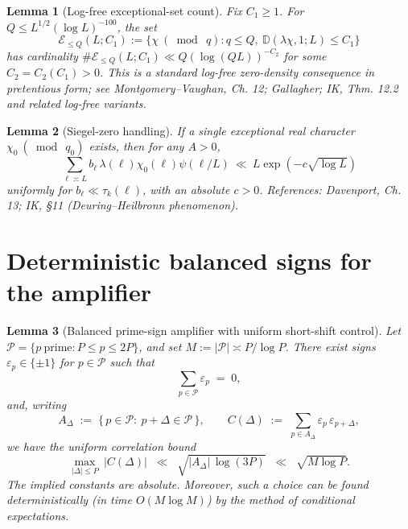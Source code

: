 \documentclass[11pt]{article}
\newtheorem{lemma}{Lemma}[part]
\theoremstyle{definition}
\theoremstyle{remark}
\numberwithin{equation}{part}
\begin{document}
\begin{lemma}[Log-free exceptional-set count]\label{lem:logfree-density}
	Fix $C_1\ge 1$. For $Q\le L^{1/2}(\log L)^{-100}$, the set
	\[
		\mathcal E_{\le Q}(L;C_1):=\{\chi\ (\bmod\ q): q\le Q,\ \mathbb D(\lambda\chi,1;L)\le C_1\}
	\]
	has cardinality $\#\mathcal E_{\le Q}(L;C_1)\ll Q(\log (QL))^{-C_2}$ for some $C_2=C_2(C_1)>0$. This is a standard log-free zero-density consequence in pretentious form; see Montgomery--Vaughan, Ch. 12; Gallagher; IK, Thm. 12.2 and related log-free variants.
\end{lemma}

\begin{lemma}[Siegel-zero handling]\label{lem:siegel}
	If a single exceptional real character $\chi_0\ (\bmod\ q_0)$ exists, then for any $A>0$,
	\[
		\sum_{\ell\asymp L} b_\ell\,\lambda(\ell)\chi_0(\ell)\psi(\ell/L)\ \ll\ L\exp(-c\sqrt{\log L})
	\]
	uniformly for $b_\ell\ll \tau_k(\ell)$, with an absolute $c>0$. References: Davenport, Ch. 13; IK, \S11 (Deuring--Heilbronn phenomenon).
\end{lemma}

\section{Deterministic balanced signs for the amplifier}


\begin{lemma}[Balanced prime-sign amplifier with uniform short-shift control]\label{lem:balanced-signs}
	Let $\mathcal P=\{p\ \text{prime}: P\le p\le 2P\}$, and set $M:=|\mathcal P|\asymp P/\log P$.
	There exist signs $\varepsilon_p\in\{\pm 1\}$ for $p\in\mathcal P$ such that
	\begin{equation}\label{eq:balanced-sum-zero}
		\sum_{p\in\mathcal P}\varepsilon_p \;=\; 0,
	\end{equation}
	and, writing
	\[
		A_\Delta \;:=\; \{\,p\in\mathcal P:\ p+\Delta\in\mathcal P\,\},
		\qquad
		C(\Delta)\;:=\;\sum_{p\in A_\Delta}\varepsilon_p\,\varepsilon_{p+\Delta},
	\]
	we have the uniform correlation bound
	\begin{equation}\label{eq:balanced-correlation}
		\max_{|\Delta|\le P}\ |C(\Delta)|
		\;\;\ll\;\; \sqrt{|A_\Delta|\,\log(3P)}
		\;\;\ll\;\; \sqrt{M\log P}.
	\end{equation}
	The implied constants are absolute. Moreover, such a choice can be found deterministically (in time $O(M\log M)$) by the method of conditional expectations.
\end{lemma}
\end{document}
